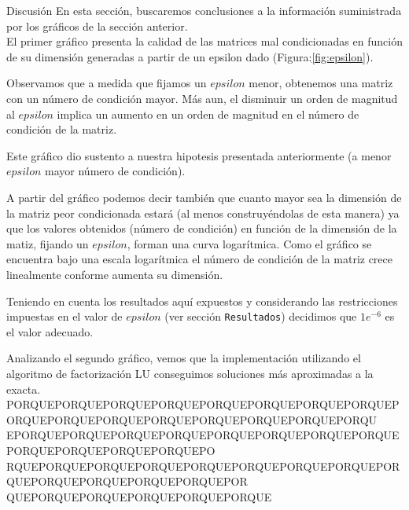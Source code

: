 \begin{section}{Discusión}
	En esta sección, buscaremos conclusiones a la información suministrada por los gráficos de la sección anterior.\\
	
	El primer gráfico presenta la calidad de las matrices mal condicionadas en función de su dimensión generadas a 
	partir de un epsilon dado (Figura:\ref{fig:epsilon}).
	
	Observamos que a medida que fijamos un $epsilon$ menor, obtenemos una matriz con un número de condición mayor. 
	Más aun, el disminuir un orden de magnitud al $epsilon$ implica un aumento en un orden de magnitud en el número
	 de condición de la matriz.
	
	Este gráfico dio sustento a nuestra hipotesis presentada anteriormente (a menor $epsilon$ mayor número de 
	condición).
	
	A partir del gráfico podemos decir también que cuanto mayor sea la dimensión de la  matriz peor condicionada 
	estará (al menos construyéndolas de esta manera) ya que los valores obtenidos (número de condición) en función 
	de la dimensión de la matiz, fijando un $epsilon$, forman una curva logarítmica. Como el gráfico se encuentra 
	bajo una escala logarítmica el número de condición de la matriz crece linealmente conforme aumenta su dimensión.
	
	Teniendo en cuenta los resultados aquí expuestos y considerando las restricciones impuestas en el valor de 
	$epsilon$ (ver sección \texttt{Resultados}) decidimos que $1e^{-6}$ es el valor adecuado.
	
	Analizando el segundo gráfico, vemos que la implementación utilizando el algoritmo de factorización LU conseguimos soluciones más aproximadas a la exacta. PORQUEPORQUEPORQUEPORQUEPORQUEPORQUEPORQUEPORQUEPORQUEPORQUEPORQUEPORQUEPORQUEPORQUEPORQUEPORQU
	EPORQUEPORQUEPORQUEPORQUEPORQUEPORQUEPORQUEPORQUEPORQUEPORQUEPORQUEPORQUEPO
	RQUEPORQUEPORQUEPORQUEPORQUEPORQUEPORQUEPORQUEPORQUEPORQUEPORQUEPORQUEPORQUEPOR
	QUEPORQUEPORQUEPORQUEPORQUEPORQUE
\end{section}
